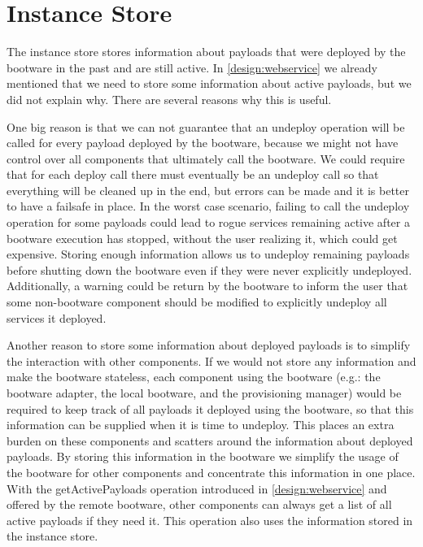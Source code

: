 \section{Instance Store}
\label{design:instancestore}

The instance store stores information about payloads that were deployed by the bootware in the past and are still active.
In \autoref{design:webservice} we already mentioned that we need to store some information about active payloads, but we did not explain why.
There are several reasons why this is useful.

One big reason is that we can not guarantee that an undeploy operation will be called for every payload deployed by the bootware, because we might not have control over all components that ultimately call the bootware.
We could require that for each deploy call there must eventually be an undeploy call so that everything will be cleaned up in the end, but errors can be made and it is better to have a failsafe in place.
In the worst case scenario, failing to call the undeploy operation for some payloads could lead to rogue services remaining active after a bootware execution has stopped, without the user realizing it, which could get expensive.
Storing enough information allows us to undeploy remaining payloads before shutting down the bootware even if they were never explicitly undeployed.
Additionally, a warning could be return by the bootware to inform the user that some non-bootware component should be modified to explicitly undeploy all services it deployed.

Another reason to store some information about deployed payloads is to simplify the interaction with other components.
If we would not store any information and make the bootware stateless, each component using the bootware (e.g.: the bootware adapter, the local bootware, and the provisioning manager) would be required to keep track of all payloads it deployed using the bootware, so that this information can be supplied when it is time to undeploy.
This places an extra burden on these components and scatters around the information about deployed payloads.
By storing this information in the bootware we simplify the usage of the bootware for other components and concentrate this information in one place.
With the getActivePayloads operation introduced in \autoref{design:webservice} and offered by the remote bootware, other components can always get a list of all active payloads if they need it.
This operation also uses the information stored in the instance store.

